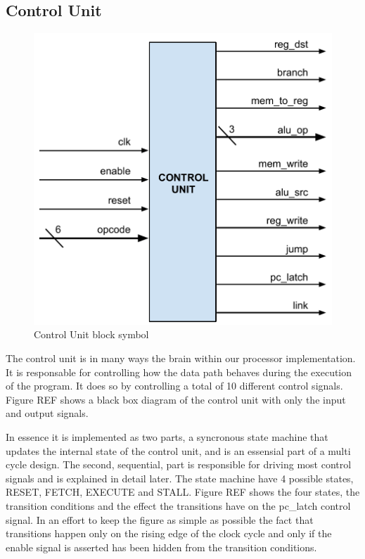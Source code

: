 \subsection{Control Unit}

\begin{figure}[h]
    \centering\includegraphics[scale=0.5]{figures/control_unit_block_symbol}
    \caption{Control Unit block symbol}
\end{figure}
The control unit is in many ways the brain within our processor implementation. It is responsable for controlling how the data path behaves during the execution of the program. It does so by controlling a total of 10 different control signals. Figure REF shows a black box diagram of the control unit with only the input and output signals.

In essence it is implemented as two parts, a syncronous state machine that updates the internal state of the control unit, and is an essensial part of a multi cycle design. The second, sequential, part is responsible for driving most control signals and is explained in detail later. The state machine have 4 possible states, RESET, FETCH, EXECUTE and STALL. Figure REF shows the four states, the transition conditions and the effect the transitions have on the pc\_latch control signal. In an effort to keep the figure as simple as possible the fact that transitions happen only on the rising edge of the clock cycle and only if the enable signal is asserted has been hidden from the transition conditions.


